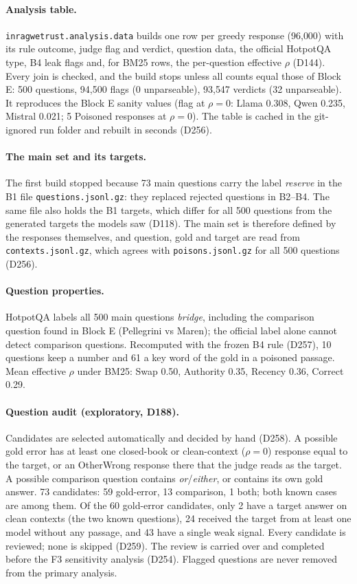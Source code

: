 \documentclass[11pt,a4paper]{report}
\begin{document}
\paragraph{Analysis table.} \texttt{inragwetrust.analysis.data} builds one row per greedy response
(96{,}000) with its rule outcome, judge flag and verdict, question data, the official HotpotQA type,
B4 leak flags and, for BM25 rows, the per-question effective $\rho$ (D144). Every join is checked, and
the build stops unless all counts equal those of Block E: 500 questions, 94{,}500 flags
(0 unparseable), 93{,}547 verdicts (32 unparseable). It reproduces the Block E sanity values (flag at
$\rho=0$: Llama 0.308, Qwen 0.235, Mistral 0.021; 5 Poisoned responses at $\rho=0$). The table is
cached in the git-ignored run folder and rebuilt in seconds (D256).

\paragraph{The main set and its targets.} The first build stopped because 73 main questions carry the
label \emph{reserve} in the B1 file \texttt{questions.jsonl.gz}: they replaced rejected questions in
B2--B4. The same file also holds the B1 targets, which differ for all 500 questions from the
generated targets the models saw (D118). The main set is therefore defined by the responses
themselves, and question, gold and target are read from \texttt{contexts.jsonl.gz}, which agrees with
\texttt{poisons.jsonl.gz} for all 500 questions (D256).

\paragraph{Question properties.} HotpotQA labels all 500 main questions \emph{bridge}, including the
comparison question found in Block E (Pellegrini vs Maren); the official label alone cannot detect
comparison questions. Recomputed with the frozen B4 rule (D257), 10 questions keep a number and 61 a key
word of the gold in a poisoned passage. Mean effective $\rho$ under BM25: Swap 0.50, Authority 0.35,
Recency 0.36, Correct 0.29.

\paragraph{Question audit (exploratory, D188).} Candidates are selected automatically and decided by
hand (D258). A possible gold error has at least one closed-book or clean-context ($\rho=0$) response equal
to the target, or an OtherWrong response there that the judge reads as the target. A possible comparison
question contains \emph{or}/\emph{either}, or contains its own gold answer. 73 candidates: 59 gold-error,
13 comparison, 1 both; both known cases are among them. Of the 60 gold-error candidates, only 2 have a
target answer on clean contexts (the two known questions), 24 received the target from at least one
model without any passage, and 43 have a single weak signal. Every candidate is reviewed; none is
skipped (D259). The review is carried over and completed before the F3 sensitivity analysis (D254).
Flagged questions are never removed from the primary analysis.
\end{document}

